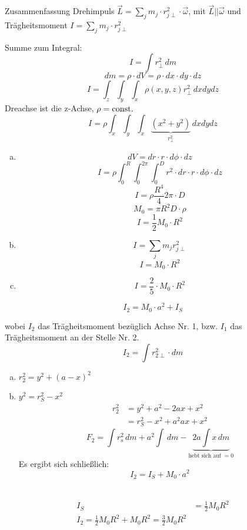 \documentclass[a4paper,10pt]{scrartcl}
\begin{document}
\begin{seg}{Zusammenfassung}
 Drehimpuls $\vec L = \sum_j m_j \cdot r_{j\perp}^2\cdot \vec \omega$, mit $\vec L || \vec \omega$ und Trägheitsmoment $ I=\sum_j m_j \cdot r_{j\perp}^2$\\
\end{seg}
Summe zum Integral: 
\[
 I=\int r_\perp^2\, dm
\]
\[
 dm=\rho \cdot dV= \rho \cdot dx\cdot dy \cdot dz
\]
\[
 I=\int_z\int_y\int_x \rho(x,y,z) r_\perp^2 \, dx dy dz
\]
Dreachse ist die z-Achse, $\rho= \text{const}.$
\[
 I=\rho \int_x \int_y \int_x \underbrace{(x^2+y^2)}_{r_\perp^2}\, dx dy dz
\]
\begin{ex}
 \begin{enumerate}[a)]
  \item 
\begin{sg}
\[
 dV=dr\cdot r \cdot d\phi \cdot dz
\]
\[
 I=\rho \int_0^R \int_0^{2\pi} \int_0^D r^2 \cdot dr\cdot r \cdot d\phi \cdot dz
\]
\[
\boxed{I=\rho \frac{R^4}{4} 2\pi \cdot D}
\]
\[
 M_0=\pi R^2 D \cdot \rho
\]
\[
 I=\frac{1}{2} M_0 \cdot R^2
\]
\end{sg}
\item 
\begin{sg}
\[
 I=\sum_j m_j r_{j\perp}^2
\]
\fixme
\[
 I=M_0 \cdot R^2
\]
\end{sg}
\item 
\begin{sg}[Kugel]
\[
 I=\frac{2}{5} \cdot M_0 \cdot R^2
\]
\end{sg}
 \end{enumerate}
\end{ex}
\begin{sg}
\begin{st}
\[
 \boxed{I_2=M_0 \cdot a^2+ I_S}
\]
\end{st}
wobei $I_2$ das Trägheitsmoment bezüglich Achse Nr. 1, bzw. $I_1$ das Trägheitsmoment an der Stelle Nr. 2.
\[
 I_2=\int r_{2\perp}^2\cdot dm
\]
\begin{enumerate}[a)]
 \item $r_2^2=y^2+(a-x)^2$
\item $y^2=r_S^2-x^2$
\begin{align*}
 r_2^2&=y^2+a^2-2ax+x^2\\
&= r_S^2-x^2+a^2ax+x^2
\end{align*}
\[
 F_2=\int r_s^2 \, dm+ a^2 \int \, dm - \underbrace{2a\int x \, dm}_{\text{hebt sich auf $=0$}}
\]
Es ergibt sich schließlich:
\[
 \boxed{I_2= I_S+ M_0 \cdot a^2}
\]
\end{enumerate}
\end{sg}
\begin{ex}
 \\
\begin{align*}
 I_S&=\frac{1}{2} M_0 R^2\\
I_2= \frac{1}{2} M_0 R^2+ M_0 R^2= \frac{3}{2} M_0 R^2
\end{align*}
\end{ex}
\end{document}
